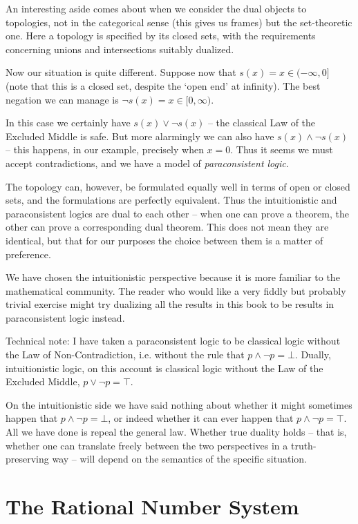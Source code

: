 \documentclass[oneside,english]{amsbook}
\numberwithin{section}{chapter}
\theoremstyle{plain}
\theoremstyle{definition}
\begin{document}
An interesting aside comes about when we consider the dual objects to topologies, not in the categorical sense (this gives us frames) but the set-theoretic one. Here a topology is specified by its closed sets, with the requirements concerning unions and intersections suitably dualized.

Now our situation is quite different. Suppose now that $s(x) = x\in (-\infty, 0]$ (note that this is a closed set, despite the `open end' at infinity). The best negation we can manage is $\lnot s(x) = x\in [0, \infty)$.

In this case we certainly have $s(x)\lor \lnot s(x)$ -- the classical Law of the Excluded Middle is safe. But more alarmingly we can also have $s(x)\land \lnot s(x)$ -- this happens, in our example, precisely when $x = 0$. Thus it seems we must accept contradictions, and we have a model of \emph{paraconsistent logic}.

The topology can, however, be formulated equally well in terms of open or closed sets, and the formulations are perfectly equivalent. Thus the intuitionistic and paraconsistent logics are dual to each other -- when one can prove a theorem, the other can prove a corresponding dual theorem. This does not mean they are identical, but that for our purposes the choice between them is a matter of preference. 

We have chosen the intuitionistic perspective because it is more familiar to the mathematical community. The reader who would like a very fiddly but probably trivial exercise might try dualizing all the results in this book to be results in paraconsistent logic instead.

Technical note: I have taken a paraconsistent logic to be classical logic without the Law of Non-Contradiction, i.e. without the rule that $p\land\lnot p = \bot$. Dually, intuitionistic logic, on this account is classical logic without the Law of the Excluded Middle, $p\lor\lnot p = \top$. 

On the intuitionistic side we have said nothing about whether it might sometimes happen that $p\land\lnot p = \bot$, or indeed whether it can ever happen that $p\land\lnot p = \top$. All we have done is repeal the general law. Whether true duality holds -- that is, whether one can translate freely between the two perspectives in a truth-preserving way -- will depend on the semantics of the specific situation.

\section{The Rational Number System}
\end{document}
